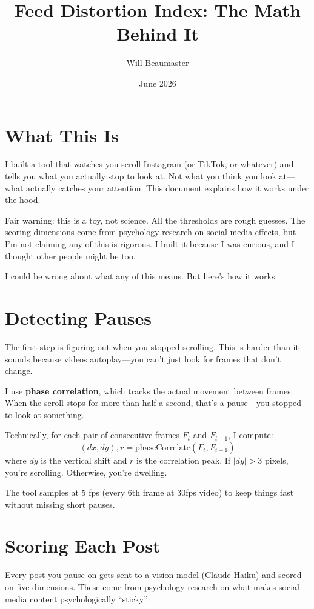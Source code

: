 \documentclass[11pt]{article}
\title{Feed Distortion Index: The Math Behind It}
\author{Will Beaumaster}
\date{June 2026}
\begin{document}
\maketitle

\section*{What This Is}

I built a tool that watches you scroll Instagram (or TikTok, or whatever) and tells you what you actually stop to look at. Not what you think you look at—what actually catches your attention. This document explains how it works under the hood.

Fair warning: this is a toy, not science. All the thresholds are rough guesses. The scoring dimensions come from psychology research on social media effects, but I'm not claiming any of this is rigorous. I built it because I was curious, and I thought other people might be too.

I could be wrong about what any of this means. But here's how it works.

\section{Detecting Pauses}

The first step is figuring out when you stopped scrolling. This is harder than it sounds because videos autoplay—you can't just look for frames that don't change.

I use \textbf{phase correlation}, which tracks the actual movement between frames. When the scroll stops for more than half a second, that's a pause—you stopped to look at something.

Technically, for each pair of consecutive frames $F_t$ and $F_{t+1}$, I compute:
\[
(dx, dy), r = \text{phaseCorrelate}(F_t, F_{t+1})
\]
where $dy$ is the vertical shift and $r$ is the correlation peak. If $|dy| > 3$ pixels, you're scrolling. Otherwise, you're dwelling.

The tool samples at 5 fps (every 6th frame at 30fps video) to keep things fast without missing short pauses.

\section{Scoring Each Post}

Every post you pause on gets sent to a vision model (Claude Haiku) and scored on five dimensions. These come from psychology research on what makes social media content psychologically ``sticky'':
\end{document}
